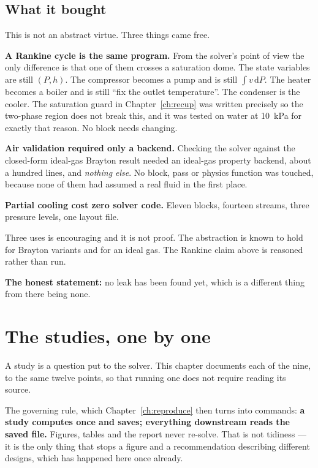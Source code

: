 \documentclass[11pt,a4paper]{report}
\begin{document}
\section{What it bought}

This is not an abstract virtue. Three things came free.

\textbf{A Rankine cycle is the same program.} From the solver's point of
view the only difference is that one of them crosses a saturation dome. The
state variables are still $(P,h)$. The compressor becomes a pump and is
still $\int v\,\mathrm{d}P$. The heater becomes a boiler and is still ``fix
the outlet temperature''. The condenser is the cooler. The saturation guard
in Chapter~\ref{ch:recup} was written precisely so the two-phase region does
not break this, and it was tested on water at \SI{10}{\kilo\pascal} for
exactly that reason. No block needs changing.

\textbf{Air validation required only a backend.} Checking the solver against
the closed-form ideal-gas Brayton result needed an ideal-gas property
backend, about a hundred lines, and \emph{nothing else}. No block, pass or
physics function was touched, because none of them had assumed a real fluid
in the first place.

\textbf{Partial cooling cost zero solver code.} Eleven blocks, fourteen
streams, three pressure levels, one layout file.

\begin{caveat}[title={Caveat: generality tested three times is a hypothesis}]
Three uses is encouraging and it is not proof. The abstraction is known to
hold for Brayton variants and for an ideal gas. The Rankine claim above is
reasoned rather than run.

\textbf{The honest statement:} no leak has been found yet, which is a
different thing from there being none.
\end{caveat}

\chapter{The studies, one by one}
\label{ch:studies}

A study is a question put to the solver. This chapter documents each of
the nine, to the same twelve points, so that running one does not
require reading its source.

The governing rule, which Chapter~\ref{ch:reproduce} then turns into
commands: \textbf{a study computes once and saves; everything
downstream reads the saved file.} Figures, tables and the report never
re-solve. That is not tidiness --- it is the only thing that stops a
figure and a recommendation describing different designs, which has
happened here once already.
\end{document}
